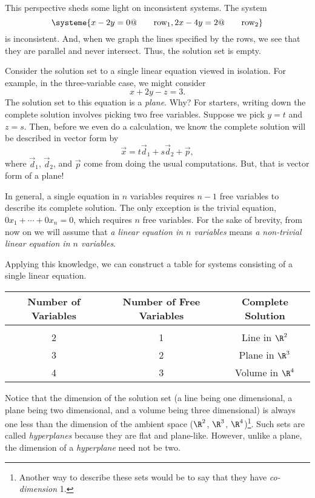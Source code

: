 	This perspective sheds some light on inconsistent systems. The system
	\[
		\systeme{
			x-2y=0@\qquad\text{row}_1,
			2x-4y=2@\qquad\text{row}_2
		}
	\]
	is inconsistent. And, when we graph the lines specified by the rows, we see that they are parallel 
	and never intersect. Thus, the solution set is empty.


	Consider the solution set to a single linear equation viewed in isolation. For example,
	in the three-variable case, we might consider
	\[
		x+2y-z=3.
	\]
	The solution set to this equation is a \emph{plane}. Why? For starters, writing down the complete
	solution involves picking two free variables. Suppose we pick $y=t$ and $z=s$. Then, before we
	even do a calculation, we know the complete solution will be described in vector form by
	\[
		\vec x=t\vec d_1+s\vec d_2+\vec p,
	\]
	where $\vec d_1$, $\vec d_2$, and $\vec p$ come from doing the usual computations. But, that is vector form
	of a plane!

	In general, a single equation in $n$ variables requires $n-1$ free variables to describe its complete
	solution. The only exception is the trivial equation, $0x_1+\cdots +0x_n=0$, which requires $n$ free variables.
	For the sake of brevity, from now on we will assume that \emph{a linear equation in $n$ variables} means 
	\emph{a non-trivial
	linear equation in $n$ variables}.

	Applying this knowledge, we can construct a table for systems consisting of a single linear equation.

	\begin{center}
		\begin{tabular}{ccc}
			Number of Variables & Number of Free Variables & Complete Solution\\
			\hline\\[-9pt]
			2 & 1 & Line in $\R^2$\\
			3 & 2 & Plane in $\R^3$\\
			4 & 3 & Volume in $\R^4$\\
		\end{tabular}
	\end{center}

	Notice that the dimension of the solution set (a line being one dimensional, a plane being two dimensional, and a volume
	being three dimensional) is always one less than the dimension of the ambient space ($\R^2$, $\R^3$, $\R^4$)\footnote{
		Another way to describe these sets would be to say that they have \emph{co-dimension} 1.}.
	Such sets are called \emph{hyperplanes} because they are flat and plane-like. However, unlike a plane,
	the dimension of a \emph{hyperplane} need not be two.

